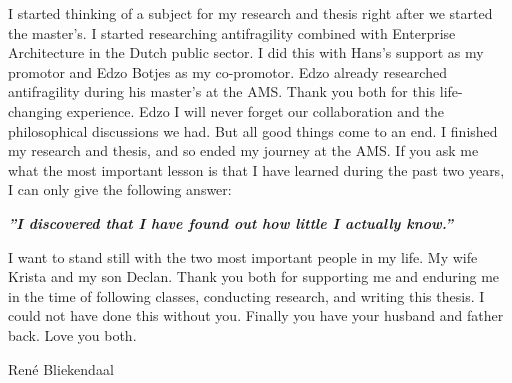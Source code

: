 {	I started thinking of a subject for my research and thesis right after we started the master's. I started researching antifragility combined with Enterprise Architecture in the Dutch public sector. I did this with Hans's support as my promotor and Edzo Botjes as my co-promotor. Edzo already researched antifragility during his master's at the AMS. Thank you both for this life-changing experience. Edzo I will never forget our collaboration and the philosophical discussions we had. But all good things come to an end. I finished my research and thesis, and so ended my journey at the AMS. If you ask me what the most important lesson is that I have learned during the past two years, I can only give the following answer:
	\begin{center}
	\textbf{\textit{''I discovered that I have found out how little I actually know.''}}
	\end{center}
	I want to stand still with the two most important people in my life. My wife Krista and my son Declan. Thank you both for supporting me and enduring me in the time of following classes, conducting research, and writing this thesis. I could not have done this without you. Finally you have your husband and father back. Love you both.
	
	\vspace{\baselineskip}
	\noindent René Bliekendaal

}%
